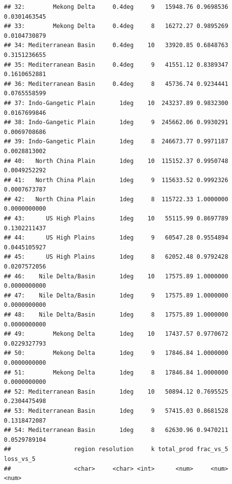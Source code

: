 \documentclass[
  11pt,
]{article}
\begin{document}
\begin{verbatim}
## 32:        Mekong Delta     0.4deg     9   15948.76 0.9698536 0.0301463545
## 33:        Mekong Delta     0.4deg     8   16272.27 0.9895269 0.0104730879
## 34: Mediterranean Basin     0.4deg    10   33920.85 0.6848763 0.3151236655
## 35: Mediterranean Basin     0.4deg     9   41551.12 0.8389347 0.1610652881
## 36: Mediterranean Basin     0.4deg     8   45736.74 0.9234441 0.0765558599
## 37: Indo-Gangetic Plain       1deg    10  243237.89 0.9832300 0.0167699846
## 38: Indo-Gangetic Plain       1deg     9  245662.06 0.9930291 0.0069708686
## 39: Indo-Gangetic Plain       1deg     8  246673.77 0.9971187 0.0028813002
## 40:   North China Plain       1deg    10  115152.37 0.9950748 0.0049252292
## 41:   North China Plain       1deg     9  115633.52 0.9992326 0.0007673787
## 42:   North China Plain       1deg     8  115722.33 1.0000000 0.0000000000
## 43:      US High Plains       1deg    10   55115.99 0.8697789 0.1302211437
## 44:      US High Plains       1deg     9   60547.28 0.9554894 0.0445105927
## 45:      US High Plains       1deg     8   62052.48 0.9792428 0.0207572056
## 46:    Nile Delta/Basin       1deg    10   17575.89 1.0000000 0.0000000000
## 47:    Nile Delta/Basin       1deg     9   17575.89 1.0000000 0.0000000000
## 48:    Nile Delta/Basin       1deg     8   17575.89 1.0000000 0.0000000000
## 49:        Mekong Delta       1deg    10   17437.57 0.9770672 0.0229327793
## 50:        Mekong Delta       1deg     9   17846.84 1.0000000 0.0000000000
## 51:        Mekong Delta       1deg     8   17846.84 1.0000000 0.0000000000
## 52: Mediterranean Basin       1deg    10   50894.12 0.7695525 0.2304475498
## 53: Mediterranean Basin       1deg     9   57415.03 0.8681528 0.1318472087
## 54: Mediterranean Basin       1deg     8   62630.96 0.9470211 0.0529789104
##                  region resolution     k total_prod frac_vs_5    loss_vs_5
##                  <char>     <char> <int>      <num>     <num>        <num>
\end{verbatim}
\end{document}
